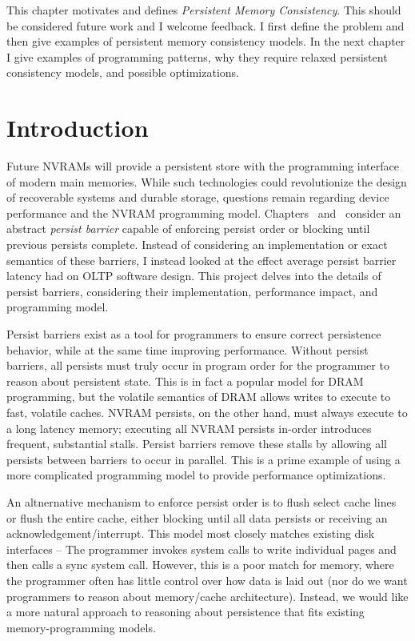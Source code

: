 This chapter motivates and defines \emph{Persistent Memory Consistency}.
This should be considered future work and I welcome feedback.
I first define the problem and then give examples of persistent memory consistency models.
In the next chapter I give examples of programming patterns, why they require relaxed persistent consistency models, and possible optimizations.

\section{Introduction}
\label{sec:PMC:Intro}

Future NVRAMs will provide a persistent store with the programming interface of modern main memories.
While such technologies could revolutionize the design of recoverable systems and durable storage, questions remain regarding device performance and the NVRAM programming model.
Chapters~ and~ consider an abstract \emph{persist barrier} capable of enforcing persist order or blocking until previous persists complete.
Instead of considering an implementation or exact semantics of these barriers, I instead looked at the effect average persist barrier latency had on OLTP software design.
This project delves into the details of persist barriers, considering their implementation, performance impact, and programming model.

Persist barriers exist as a tool for programmers to ensure correct persistence behavior, while at the same time improving performance.
Without persist barriers, all persists must truly occur in program order for the programmer to reason about persistent state.
This is in fact a popular model for DRAM programming, but the volatile semantics of DRAM allows writes to execute to fast, volatile caches.
NVRAM persists, on the other hand, must always execute to a long latency memory; executing all NVRAM persists in-order introduces frequent, substantial stalls.
Persist barriers remove these stalls by allowing all persists between barriers to occur in parallel.
This is a prime example of using a more complicated programming model to provide performance optimizations.

An altnernative mechanism to enforce persist order is to flush select cache lines or flush the entire cache, either blocking until all data persists or receiving an acknowledgement/interrupt.
This model most closely matches existing disk interfaces -- The programmer invokes system calls to write individual pages and then calls a sync system call.
However, this is a poor match for memory, where the programmer often has little control over how data is laid out (nor do we want programmers to reason about memory/cache architecture).
Instead, we would like a more natural approach to reasoning about persistence that fits existing memory-programming models.

